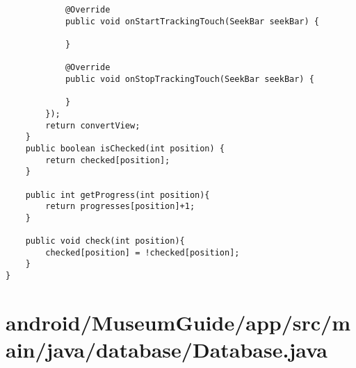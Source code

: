 \begin{lstlisting}
            @Override
            public void onStartTrackingTouch(SeekBar seekBar) {

            }

            @Override
            public void onStopTrackingTouch(SeekBar seekBar) {

            }
        });
        return convertView;
    }
    public boolean isChecked(int position) {
        return checked[position];
    }

    public int getProgress(int position){
        return progresses[position]+1;
    }

    public void check(int position){
        checked[position] = !checked[position];
    }
}
\end{lstlisting}
\newpage
\section{android/MuseumGuide/app/src/main/java/database/Database.java}
